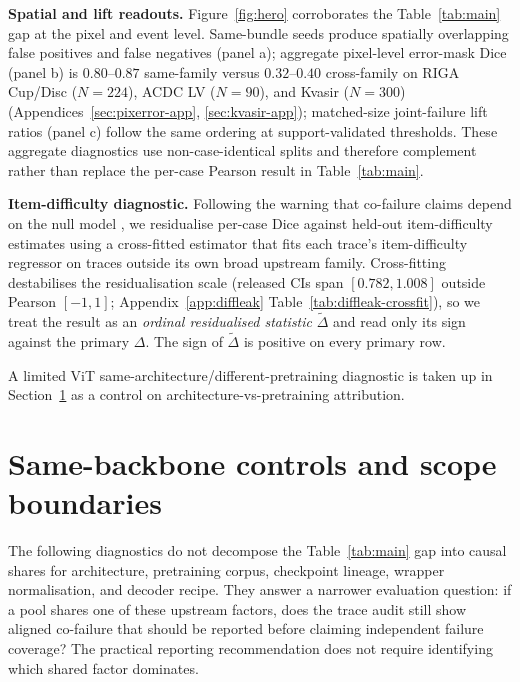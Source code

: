 \documentclass{article}
\begin{document}
\textbf{Spatial and lift readouts.} Figure~\ref{fig:hero} corroborates the Table~\ref{tab:main} gap at the pixel and event level. Same-bundle seeds produce spatially overlapping false positives and false negatives (panel a); aggregate pixel-level error-mask Dice (panel b) is $0.80$--$0.87$ same-family versus $0.32$--$0.40$ cross-family on RIGA Cup/Disc ($N{=}224$), ACDC LV ($N{=}90$), and Kvasir ($N{=}300$) (Appendices~\ref{sec:pixerror-app}, \ref{sec:kvasir-app}); matched-size joint-failure lift ratios (panel c) follow the same ordering at support-validated thresholds. These aggregate diagnostics use non-case-identical splits and therefore complement rather than replace the per-case Pearson result in Table~\ref{tab:main}.

\textbf{Item-difficulty diagnostic.} Following the warning that co-failure claims depend on the null model \citep{subjectivity2026}, we residualise per-case Dice against held-out item-difficulty estimates using a cross-fitted estimator that fits each trace's item-difficulty regressor on traces outside its own broad upstream family. Cross-fitting destabilises the residualisation scale (released CIs span $[0.782, 1.008]$ outside Pearson $[-1,1]$; Appendix~\ref{app:diffleak} Table~\ref{tab:diffleak-crossfit}), so we treat the result as an \emph{ordinal residualised statistic} $\tilde{\Delta}$ and read only its sign against the primary $\Delta$. The sign of $\tilde{\Delta}$ is positive on every primary row.

A limited ViT same-architecture/different-pretraining diagnostic is taken up in Section~\ref{sec:controls} as a control on architecture-vs-pretraining attribution.

\section{Same-backbone controls and scope boundaries}
\label{sec:controls}
\label{sec:evidence-taxonomy}

The following diagnostics do not decompose the Table~\ref{tab:main} gap into causal shares for architecture, pretraining corpus, checkpoint lineage, wrapper normalisation, and decoder recipe. They answer a narrower evaluation question: if a pool shares one of these upstream factors, does the trace audit still show aligned co-failure that should be reported before claiming independent failure coverage? The practical reporting recommendation does not require identifying which shared factor dominates.
\end{document}
